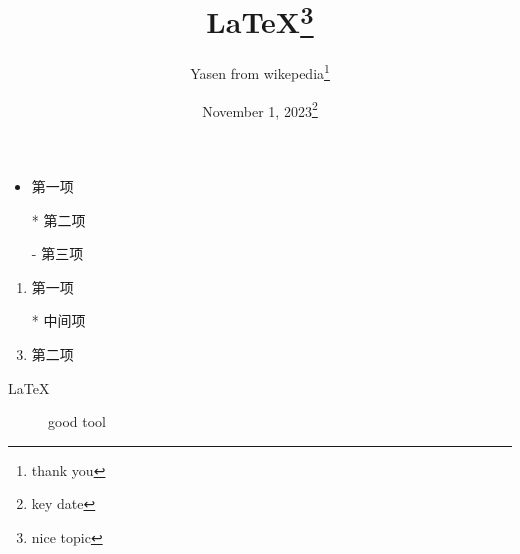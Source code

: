 \documentclass[]{ctexart}
\title{LaTeX\thanks{nice topic}}
\author{Yasen from wikepedia\thanks{thank you}}
\date{November 1, 2023\thanks{key date}}
\begin{document}
	\maketitle
	
	
	\begin{itemize}
		\item 第一项
		\item[*] 第二项
		\item[-] 第三项
	\end{itemize}
	
	\begin{enumerate}
		\item 第一项
		\item[*] 中间项
		\item 第二项
	\end{enumerate}
	
	\begin{description}
		\item[\LaTeX] good tool
	\end{description}
	
\end{document}

